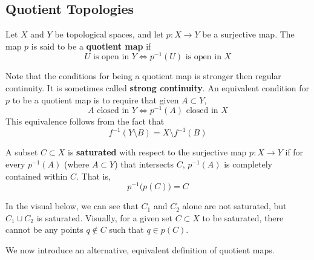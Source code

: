   \subsection{Quotient Topologies}

    \begin{definition}
    Let $X$ and $Y$ be topological spaces, and let $p: X \longrightarrow Y$ be a surjective map. The map $p$ is said to be a \textbf{quotient map} if
    \[U \text{ is open in } Y \iff p^{-1}(U) \text{ is open in } X\]
    \end{definition}

    Note that the conditions for being a quotient map is stronger then regular continuity. It is sometimes called \textbf{strong continuity}. An equivalent condition for $p$ to be a quotient map is to require that given $A \subset Y$, 
    \[A \text{ closed in } Y \iff p^{-1}(A) \text{ closed in } X\]
    This equivalence follows from the fact that
    \[f^{-1}(Y \setminus B) = X \setminus f^{-1}(B)\]

    \begin{definition}
    A subset $C \subset X$ is \textbf{saturated} with respect to the surjective map $p: X \longrightarrow Y$ if for every $p^{-1} (A)$ (where $A \subset Y$) that intersects $C$, $p^{-1}(A)$ is completely contained within $C$. That is, 
    \[p^{-1} \big( p(C) \big) = C\]
    \end{definition}

    In the visual below, we can see that $C_1$ and $C_2$ alone are not saturated, but $C_1 \cup C_2$ is saturated. Visually, for a given set $C \subset X$ to be saturated, there cannot be any points $q \not\in C$ such that $q \in p(C)$. 

    \begin{center}
    \end{center}
    We now introduce an alternative, equivalent definition of quotient maps. 

